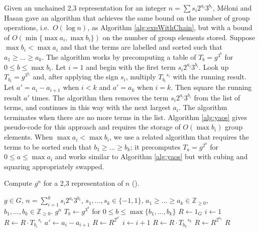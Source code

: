 \documentclass{ucalgthes1}
\theoremstyle{definition}
\newcommand{\ZZgez}{\mathbb{Z}_{\ge 0}}
\begin{document}
Given an unchained 2,3 representation for an integer $n = \sum s_i 2^{a_i} 3^{b_i}$, M\'{e}loni and Hasan \cite[Section 3.2]{Meloni2009} gave an algorithm that achieves the same bound on the number of group operations, i.e.\ $O(\log n)$, as Algorithm \ref{alg:expWithChain}, but with a bound of $O(\min \{\max a_i, \max b_i\})$ on the number of group elements stored.  Suppose $\max b_i < \max a_i$ and that the terms are labelled and sorted such that $a_1 \ge ... \ge a_k$.  The algorithm works by precomputing a table of $T_b = g^{3^b}$ for $0 \le b \le \max b_i$.  Let $i=1$ and begin with the first term $s_i2^{a_i}3^{b_i}$.  Look up $T_{b_i} = g^{3^{b_i}}$ and, after applying the sign $s_i$, multiply ${T_{b_i}}^{s_i}$ with the running result.  Let $a' = a_i - a_{i+1}$ when $i < k$ and $a' = a_k$ when $i = k$.  Then square the running result $a'$ times.  The algorithm then removes the term $s_i2^{a_i}3^{b_i}$ from the list of terms, and continues in this way with the next largest $a_i$.  The algorithm terminates when there are no more terms in the list.  Algorithm  \ref{alg:yaos} gives pseudo-code for this approach and requires the storage of $O(\max b_i)$ group elements.  When $\max a_i < \max b_i$, we use a related algorithm that requires the terms to be sorted such that $b_1 \ge ... \ge b_k$; it precomputes $T_a = g^{2^a}$ for $0 \le a \le \max a_i$ and works similar to Algorithm \ref{alg:yaos} but with cubing and squaring appropriately swapped.

\begin{algorithm}[htb]
\caption{Compute $g^n$ for a 2,3 representation of $n$ (\cite[Section 3.2]{Meloni2009}).}
\label{alg:yaos}
\begin{algorithmic}[1]
\Require $g \in G$, $n = \sum_{i=1}^k s_i2^{a_i}3^{b_i}$,
$s_1,...,s_k \in \{-1, 1\}$,
$a_1 \ge ... \ge a_k \in \ZZgez$,
$b_1,...,b_k \in \ZZgez$.
\Ensure $g^n$
\State $T_b \gets g^{3^b}$ for $0 \le b \le \max \{ b_1, ..., b_k \}$ 
\State $R \gets 1_G$
\State $i \gets 1$
	\State $R \gets R \cdot {T_{b_i}}^{s_i}$ 
	\State $a' \gets a_i - a_{i+1}$
	\State $R \gets R ^ {2^{a'}}$ 
	\State $i \gets i + 1$
\EndWhile
\State $R \gets R \cdot {T_{b_k}}^{s_k}$
\State $R \gets R ^ {2^{a_k}}$ 
\State \Return $R$
\end{algorithmic}
\end{algorithm}
\end{document}
